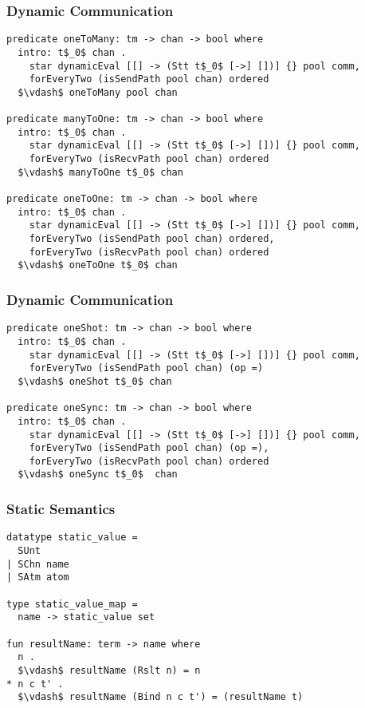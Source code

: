 \documentclass{beamer}
\begin{document}
\begin{frame}[fragile]
	\frametitle{Dynamic Communication}
\begin{lstlisting}[language=logic, mathescape]
predicate oneToMany: tm -> chan -> bool where
  intro: t$_0$ chan .
    star dynamicEval [[] -> (Stt t$_0$ [->] [])] {} pool comm,
    forEveryTwo (isSendPath pool chan) ordered
  $\vdash$ oneToMany pool chan

predicate manyToOne: tm -> chan -> bool where
  intro: t$_0$ chan .
    star dynamicEval [[] -> (Stt t$_0$ [->] [])] {} pool comm,
    forEveryTwo (isRecvPath pool chan) ordered
  $\vdash$ manyToOne t$_0$ chan

predicate oneToOne: tm -> chan -> bool where
  intro: t$_0$ chan .
    star dynamicEval [[] -> (Stt t$_0$ [->] [])] {} pool comm,
    forEveryTwo (isSendPath pool chan) ordered,
    forEveryTwo (isRecvPath pool chan) ordered
  $\vdash$ oneToOne t$_0$ chan

\end{lstlisting}
\end{frame}

\begin{frame}[fragile]
	\frametitle{Dynamic Communication}
\begin{lstlisting}[language=logic, mathescape]
predicate oneShot: tm -> chan -> bool where
  intro: t$_0$ chan .
    star dynamicEval [[] -> (Stt t$_0$ [->] [])] {} pool comm,
    forEveryTwo (isSendPath pool chan) (op =)
  $\vdash$ oneShot t$_0$ chan

predicate oneSync: tm -> chan -> bool where
  intro: t$_0$ chan .
    star dynamicEval [[] -> (Stt t$_0$ [->] [])] {} pool comm,
    forEveryTwo (isSendPath pool chan) (op =),
    forEveryTwo (isRecvPath pool chan) ordered 
  $\vdash$ oneSync t$_0$  chan
\end{lstlisting}
\end{frame}

\begin{frame}[fragile]
	\frametitle{Static Semantics}
\begin{lstlisting}[language=logic, mathescape]
datatype static_value =
  SUnt
| SChn name
| SAtm atom 

type static_value_map =
  name -> static_value set

fun resultName: term -> name where
  n .
  $\vdash$ resultName (Rslt n) = n
* n c t' . 
  $\vdash$ resultName (Bind n c t') = (resultName t)
\end{lstlisting}
\end{frame}
\end{document}
